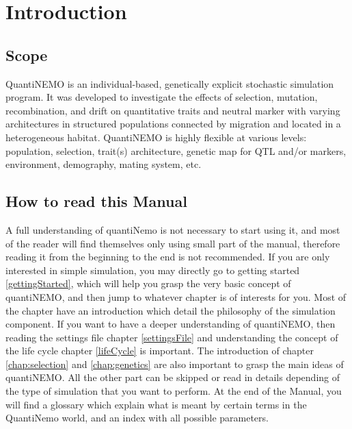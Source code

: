 \documentclass[letterpaper,12pt,oneside]{book}
\begin{document}
\frontmatter
\setcounter{tocdepth}{1}
\tableofcontents



\mainmatter
\setcounter{secnumdepth}{2}


\chapter{Introduction}\label{chap:introduction}

\section{Scope}
QuantiNEMO is an individual-based, genetically explicit stochastic simulation program. It was developed to investigate the effects of selection, mutation, recombination, and drift on quantitative traits and neutral marker with varying architectures in structured populations connected by migration and located in a heterogeneous habitat. QuantiNEMO is highly flexible at various levels: population, selection, trait(s) architecture, genetic map for QTL and/or markers, environment, demography, mating system, etc.

\section{How to read this Manual}
A full understanding of quantiNemo is not necessary to start using it, and most of the reader will find themselves only using small part of the manual, therefore reading it from the beginning to the end is not recommended. If you are only interested in simple simulation, you may directly go to getting started \ref{gettingStarted}, which will help you grasp the very basic concept of quantiNEMO, and then jump to whatever chapter is of interests for you. Most of the chapter have an introduction which detail the philosophy of the simulation component.  If you want to have a deeper understanding of quantiNEMO, then reading the settings file chapter \ref{settingsFile} and understanding the concept of the life cycle chapter \ref{lifeCycle} is important. The introduction of chapter \ref{chap:selection} and \ref{chap:genetics} are also important to grasp the main ideas of quantiNEMO. All the other part can be skipped or read in details depending of the type of simulation that you want to perform. 
At the end of the Manual, you will find a glossary which explain what is meant by certain terms in the QuantiNemo world, and an index with all possible parameters. 
\end{document}
